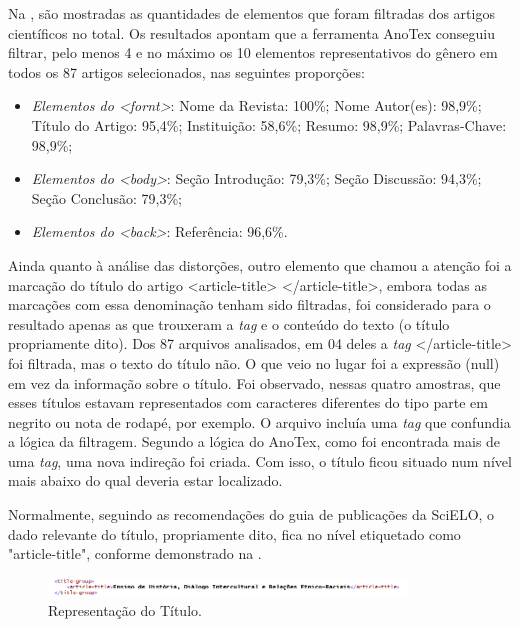 \documentclass[portuguese]{textolivre}
\begin{document}
Na , são mostradas as quantidades de elementos que foram filtradas dos artigos científicos no total. Os resultados apontam que a ferramenta AnoTex conseguiu filtrar, pelo menos 4 e no máximo os 10 elementos representativos do gênero em todos os 87 artigos selecionados, nas seguintes proporções:

\begin{itemize}
    \item \textit{Elementos do <fornt>}: Nome da Revista: 100\%; Nome Autor(es): 98,9\%; Título do Artigo: 95,4\%; Instituição: 58,6\%; Resumo: 98,9\%; Palavras-Chave: 98,9\%;
    \item \textit{Elementos do <body>}: Seção Introdução: 79,3\%; Seção Discussão: 94,3\%; Seção Conclusão: 79,3\%;
    \item \textit{Elementos do <back>}: Referência: 96,6\%.
\end{itemize}

Ainda quanto à análise das distorções, outro elemento que chamou a atenção foi a marcação do título do artigo <article-title> </article-title>, embora todas as marcações com essa denominação tenham sido filtradas, foi considerado para o resultado apenas as que trouxeram a \textit{tag} e o conteúdo do texto (o título propriamente dito). Dos 87 arquivos analisados, em 04 deles a \textit{tag} </article-title> foi filtrada, mas o texto do título não. O que veio no lugar foi a expressão (null) em vez da informação sobre o título. Foi observado, nessas quatro amostras, que esses títulos estavam representados com caracteres diferentes do tipo parte em negrito ou nota de rodapé, por exemplo. O arquivo incluía uma \textit{tag} que confundia a lógica da filtragem. Segundo a lógica do AnoTex, como foi encontrada mais de uma \textit{tag}, uma nova indireção foi criada. Com isso, o título ficou situado num nível mais abaixo do qual deveria estar localizado.

Normalmente, seguindo as recomendações do guia de publicações da SciELO, o dado relevante do título, propriamente dito, fica no nível etiquetado como "article-title", conforme demonstrado na .

\begin{figure}[htbp]
 \centering
 \includegraphics[width=0.85\textwidth]{Fig10.png}
 \caption{Representação do Título.}
 \label{fig10}
\end{figure}
\end{document}
